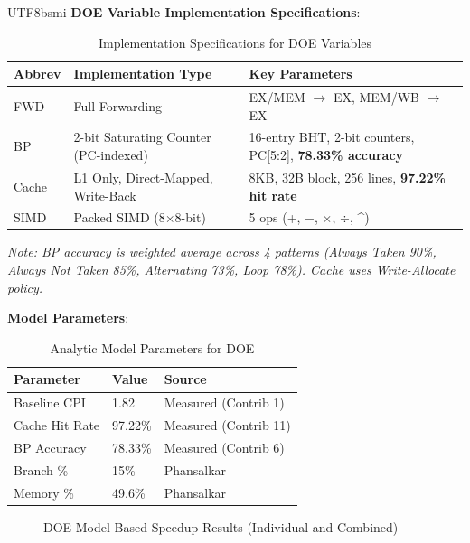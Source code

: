 \documentclass[journal,twoside]{IEEEtran}
\begin{document}
\begin{CJK}{UTF8}{bsmi}
\textbf{DOE Variable Implementation Specifications}:
\begin{table}[!t]
\centering
\caption{Implementation Specifications for DOE Variables}
\label{tab:doespec}
\footnotesize
\begin{tabular}{@{}llp{4.2cm}@{}}
\toprule
\textbf{Abbrev} & \textbf{Implementation Type} & \textbf{Key Parameters} \\
\midrule
FWD & Full Forwarding & EX/MEM $\to$ EX, MEM/WB $\to$ EX \\
BP & 2-bit Saturating Counter (PC-indexed) & 16-entry BHT, 2-bit counters, PC[5:2], \textbf{78.33\% accuracy} \\
Cache & L1 Only, Direct-Mapped, Write-Back & 8KB, 32B block, 256 lines, \textbf{97.22\% hit rate} \\
SIMD & Packed SIMD (8$\times$8-bit) & 5 ops (+, $-$, $\times$, $\div$, \^{}) \\
\bottomrule
\end{tabular}
\end{table}

\textit{Note: BP accuracy is weighted average across 4 patterns (Always Taken 90\%, Always Not Taken 85\%, Alternating 73\%, Loop 78\%). Cache uses Write-Allocate policy.}

\textbf{Model Parameters}:
\begin{table}[!t]
\centering
\caption{Analytic Model Parameters for DOE}
\footnotesize
\begin{tabular}{@{}lll@{}}
\toprule
\textbf{Parameter} & \textbf{Value} & \textbf{Source} \\
\midrule
Baseline CPI & 1.82 & Measured (Contrib 1) \\
Cache Hit Rate & 97.22\% & Measured (Contrib 11) \\
BP Accuracy & 78.33\% & Measured (Contrib 6) \\
Branch \% & 15\% & Phansalkar~\cite{phansalkar2007analysis} \\
Memory \% & 49.6\% & Phansalkar~\cite{phansalkar2007analysis} \\
\bottomrule
\end{tabular}
\end{table}



\begin{figure}[!t]
\centering
{}
\caption{DOE Model-Based Speedup Results (Individual and Combined)}
\label{fig:doe}
\end{figure}


\end{CJK}
\end{document}
